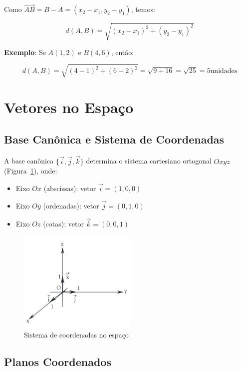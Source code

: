 Como $\overrightarrow{AB} = B - A = (x_2 - x_1, y_2 - y_1)$, temos:

\[
  d(A, B) = \sqrt{(x_2 - x_1)^2 + (y_2 - y_1)^2}
\]

\textbf{Exemplo}: Se $A(1, 2)$ e $B(4, 6)$, então:

\[
  d(A, B) = \sqrt{(4-1)^2 + (6-2)^2} = \sqrt{9 + 16} = \sqrt{25} = 5 \text{
  unidades}
\]

\section{Vetores no Espaço}

\subsection{Base Canônica e Sistema de Coordenadas}

A base canônica $\{\vec{i}, \vec{j}, \vec{k}\}$ determina o sistema cartesiano
ortogonal $Oxyz$ (Figura~\ref{fig:fig1.53}), onde:

\begin{itemize}
  \item Eixo $Ox$ (abscissas): vetor $\vec{i} = (1,0,0)$
  \item Eixo $Oy$ (ordenadas): vetor $\vec{j} = (0,1,0)$
  \item Eixo $Oz$ (cotas): vetor $\vec{k} = (0,0,1)$
\end{itemize}

\begin{figure}[H]
  \centering
  \includegraphics[width=0.5\textwidth]{./fig/fig1.53.png}
  \caption{Sistema de coordenadas no espaço}\label{fig:fig1.53}
\end{figure}

\subsection{Planos Coordenados}

